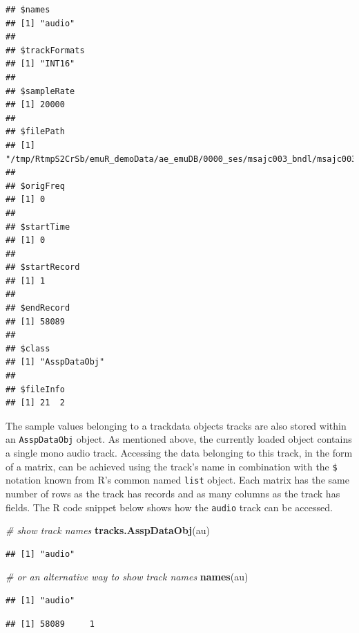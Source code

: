 \documentclass[]{book}
\newenvironment{Shaded}{\begin{snugshade}}{\end{snugshade}}
\newcommand{\CommentTok}[1]{\textcolor[rgb]{0.56,0.35,0.01}{\textit{#1}}}
\newcommand{\KeywordTok}[1]{\textcolor[rgb]{0.13,0.29,0.53}{\textbf{#1}}}
\newcommand{\NormalTok}[1]{#1}
\newcommand{\OperatorTok}[1]{\textcolor[rgb]{0.81,0.36,0.00}{\textbf{#1}}}
\begin{document}
\begin{verbatim}
## $names
## [1] "audio"
## 
## $trackFormats
## [1] "INT16"
## 
## $sampleRate
## [1] 20000
## 
## $filePath
## [1] "/tmp/RtmpS2CrSb/emuR_demoData/ae_emuDB/0000_ses/msajc003_bndl/msajc003.wav"
## 
## $origFreq
## [1] 0
## 
## $startTime
## [1] 0
## 
## $startRecord
## [1] 1
## 
## $endRecord
## [1] 58089
## 
## $class
## [1] "AsspDataObj"
## 
## $fileInfo
## [1] 21  2
\end{verbatim}

The sample values belonging to a trackdata objects tracks are also stored within an \texttt{AsspDataObj} object. As mentioned above, the currently loaded object contains a single mono audio track. Accessing the data belonging to this track, in the form of a matrix, can be achieved using the track's name in combination with the \texttt{\$} notation known from R's common named \texttt{list} object. Each matrix has the same number of rows as the track has records and as many columns as the track has fields. The R code snippet below shows how the \texttt{audio} track can be accessed.

\begin{Shaded}
\begin{Highlighting}[]
\CommentTok{# show track names}
\KeywordTok{tracks.AsspDataObj}\NormalTok{(au)}
\end{Highlighting}
\end{Shaded}

\begin{verbatim}
## [1] "audio"
\end{verbatim}

\begin{Shaded}
\begin{Highlighting}[]
\CommentTok{# or an alternative way to show track names}
\KeywordTok{names}\NormalTok{(au)}
\end{Highlighting}
\end{Shaded}

\begin{verbatim}
## [1] "audio"
\end{verbatim}

\begin{Shaded}
\end{Shaded}

\begin{verbatim}
## [1] 58089     1
\end{verbatim}
\end{document}
